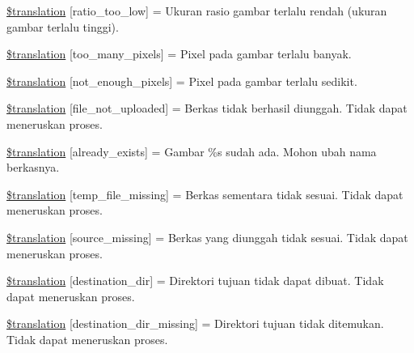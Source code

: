 \begin{DoxyCompactItemize}
\hyperlink{class_8upload_8id___i_d_8php_ac533b9a479f056b0b8623e4268f068c2}{\$translation} \mbox{[}\textquotesingle{}ratio\+\_\+too\+\_\+low\textquotesingle{}\mbox{]} = \textquotesingle{}Ukuran rasio gambar terlalu rendah (ukuran gambar terlalu tinggi).\textquotesingle{}
\item 
\hyperlink{class_8upload_8id___i_d_8php_aa4051ef64e94a3f8295c63cf85544016}{\$translation} \mbox{[}\textquotesingle{}too\+\_\+many\+\_\+pixels\textquotesingle{}\mbox{]} = \textquotesingle{}Pixel pada gambar terlalu banyak.\textquotesingle{}
\item 
\hyperlink{class_8upload_8id___i_d_8php_a1fe342c27ce61f4ff4e0120ba647033e}{\$translation} \mbox{[}\textquotesingle{}not\+\_\+enough\+\_\+pixels\textquotesingle{}\mbox{]} = \textquotesingle{}Pixel pada gambar terlalu sedikit.\textquotesingle{}
\item 
\hyperlink{class_8upload_8id___i_d_8php_a4ce76e7be0b3a03c2b47f6d70c21832e}{\$translation} \mbox{[}\textquotesingle{}file\+\_\+not\+\_\+uploaded\textquotesingle{}\mbox{]} = \textquotesingle{}Berkas tidak berhasil diunggah. Tidak dapat meneruskan proses.\textquotesingle{}
\item 
\hyperlink{class_8upload_8id___i_d_8php_afd84e910217f04139f567c41e292afa5}{\$translation} \mbox{[}\textquotesingle{}already\+\_\+exists\textquotesingle{}\mbox{]} = \textquotesingle{}Gambar \%s sudah ada. Mohon ubah nama berkasnya.\textquotesingle{}
\item 
\hyperlink{class_8upload_8id___i_d_8php_ab0fa87a88aba2624004581eed0633325}{\$translation} \mbox{[}\textquotesingle{}temp\+\_\+file\+\_\+missing\textquotesingle{}\mbox{]} = \textquotesingle{}Berkas sementara tidak sesuai. Tidak dapat meneruskan proses.\textquotesingle{}
\item 
\hyperlink{class_8upload_8id___i_d_8php_aceaaf7355acaaf10f0ae60378d03c468}{\$translation} \mbox{[}\textquotesingle{}source\+\_\+missing\textquotesingle{}\mbox{]} = \textquotesingle{}Berkas yang diunggah tidak sesuai. Tidak dapat meneruskan proses.\textquotesingle{}
\item 
\hyperlink{class_8upload_8id___i_d_8php_aff2427c72a2598aefa6d58df1dd18b08}{\$translation} \mbox{[}\textquotesingle{}destination\+\_\+dir\textquotesingle{}\mbox{]} = \textquotesingle{}Direktori tujuan tidak dapat dibuat. Tidak dapat meneruskan proses.\textquotesingle{}
\item 
\hyperlink{class_8upload_8id___i_d_8php_a9ef28d3cf09942c6c0a1e77fa09185e8}{\$translation} \mbox{[}\textquotesingle{}destination\+\_\+dir\+\_\+missing\textquotesingle{}\mbox{]} = \textquotesingle{}Direktori tujuan tidak ditemukan. Tidak dapat meneruskan proses.\textquotesingle{}

\end{DoxyCompactItemize}
